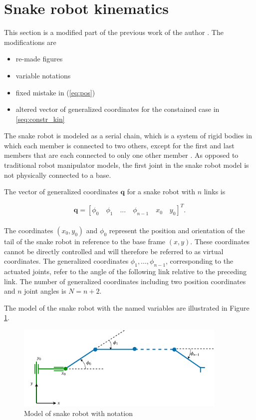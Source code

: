 \section{Snake robot kinematics}\label{sec:kin}

This section is a modified part of the previous work of the author \cite{AtussaProsjektoppgp}. The modifications are 
\begin{itemize}
    \item re-made figures
    \item variable notations
    \item fixed mistake in (\ref{eq:pos})
    \item altered vector of generalized coordinates for the constained case in \ref{seq:constr_kin}
\end{itemize}

The snake robot is modeled as a serial chain, which is a system of rigid bodies in which each member is connected to two others, except for the first and last members that are each connected to only one other member \cite{waldron2016kinematics}. As opposed to traditional robot manipulator models, the first joint in the snake robot model is not physically connected to a base.


The vector of generalized coordinates $\mathbf{q}$ for a snake robot with $n$ links is

\begin{equation} \label{eq:q}
    \mathbf{q} = 
    [
        \phi_0 \quad \phi_1 \quad ... \quad \phi_{n-1} \quad x_0 \quad y_0
    ]^T.
\end{equation}
\\
The coordinates $(x_0, y_0)$ and $\phi_0$ represent the position and orientation of the tail of the snake robot in reference to the base frame $(x,y)$. These coordinates cannot be directly controlled and will therefore be referred to as virtual coordinates. The generalized coordinates ${\phi_1, ... ,  \phi_{n-1}}$, corresponding to the actuated joints, refer to the angle of the following link relative to the preceding link. The number of generalized coordinates including two position coordinates and $n$ joint angles is $N = n+2$.

The model of the snake robot with the named variables are illustrated in Figure \ref{fig:kin_name}. 
\begin{figure}
    \centering
    \includegraphics[width=0.9\textwidth]{figures/theory/kinematics1.pdf}
    \caption{Model of snake robot with notation}
    \label{fig:kin_name}
\end{figure}


